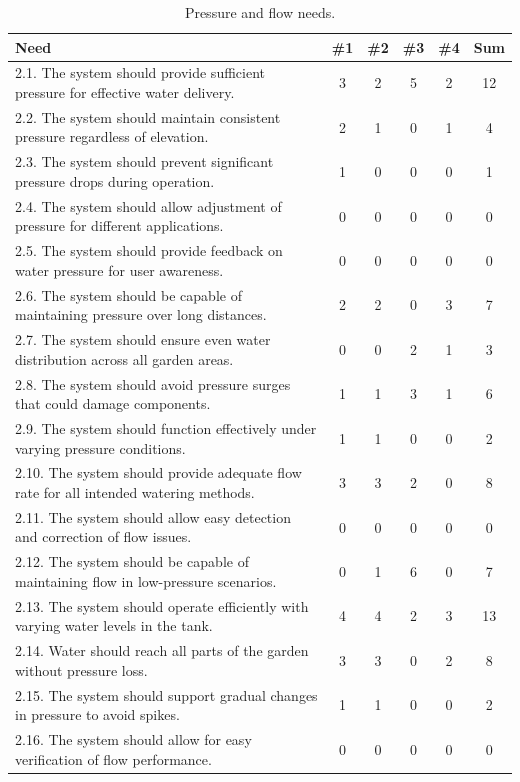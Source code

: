 \documentclass[12pt]{report}
\begin{document}
\begin{table}[H]
\centering
\caption{Pressure and flow needs.}
\label{table:1b}
\begin{tabular}{|p{10cm}|c|c|c|c|c|}
\hline
\textbf{Need} & \textbf{\#1} & \textbf{\#2} & \textbf{\#3} & \textbf{\#4} & \textbf{Sum} \\
\hline
2.1. The system should provide sufficient pressure for effective water delivery. & 3 & 2 & 5 & 2 & \cellcolor{yellow}12 \\
2.2. The system should maintain consistent pressure regardless of elevation. & 2 & 1 & 0 & 1 & 4 \\
2.3. The system should prevent significant pressure drops during operation. & 1 & 0 & 0 & 0 & 1 \\
2.4. The system should allow adjustment of pressure for different applications. & 0 & 0 & 0 & 0 & 0 \\
2.5. The system should provide feedback on water pressure for user awareness. & 0 & 0 & 0 & 0 & 0 \\
2.6. The system should be capable of maintaining pressure over long distances. & 2 & 2 & 0 & 3 & 7 \\
2.7. The system should ensure even water distribution across all garden areas. & 0 & 0 & 2 & 1 & 3 \\
2.8. The system should avoid pressure surges that could damage components. & 1 & 1 & 3 & 1 & 6 \\
2.9. The system should function effectively under varying pressure conditions. & 1 & 1 & 0 & 0 & 2 \\
2.10. The system should provide adequate flow rate for all intended watering methods. & 3 & 3 & 2 & 0 & \cellcolor{yellow}8 \\
2.11. The system should allow easy detection and correction of flow issues. & 0 & 0 & 0 & 0 & 0 \\
2.12. The system should be capable of maintaining flow in low-pressure scenarios. & 0 & 1 & 6 & 0 & 7 \\
2.13. The system should operate efficiently with varying water levels in the tank. & 4 & 4 & 2 & 3 & \cellcolor{yellow}13 \\
2.14. Water should reach all parts of the garden without pressure loss. & 3 & 3 & 0 & 2 & \cellcolor{yellow}8 \\
2.15. The system should support gradual changes in pressure to avoid spikes. & 1 & 1 & 0 & 0 & 2 \\
2.16. The system should allow for easy verification of flow performance. & 0 & 0 & 0 & 0 & 0 \\

\end{tabular}
\end{table}
\end{document}
